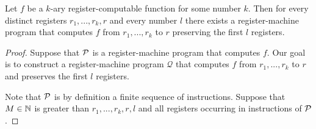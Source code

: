 \documentclass[10pt]{amsart}
\begin{document}
\begin{proposition}\label{proposition:register_computable_implies_register_computable_with_preservation_of_first_registers}
	Let $f$ be a $k$-ary register-computable function for some number $k$. Then for every distinct registers $r_1,...,r_k,r$ and every number $l$ there exists a register-machine program that computes $f$ from $r_1,...,r_k$ to $r$ preserving the first $l$ registers.
\end{proposition}
\begin{proof}
	Suppose that ${\mathcal P}$ is a register-machine program that computes $f$. Our goal is to construct a register-machine program $\mathcal{Q}$ that computes $f$ from $r_1,...,r_k$ to $r$ and preserves the first $l$ registers.

	Note that ${\mathcal P}$ is by definition a finite sequence of instructions. Suppose that $M \in {\mathbb N}$ is greater than $r_1,...,r_k,r,l$ and all registers occurring in instructions of ${\mathcal P}$.


\end{proof}
\end{document}
